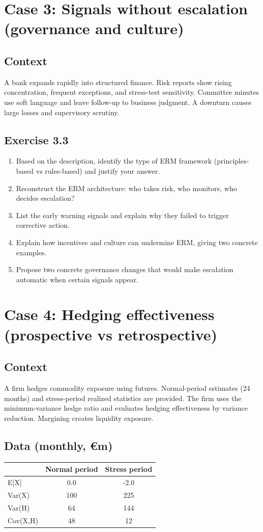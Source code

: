 \documentclass[11pt]{article}
\begin{document}
\section{Case 3: Signals without escalation (governance and culture)}
\subsection*{Context}
A bank expands rapidly into structured finance. Risk reports show rising concentration, frequent exceptions, and stress-test sensitivity. Committee minutes use soft language and leave follow-up to business judgment. A downturn causes large losses and supervisory scrutiny.

\subsection*{Exercise 3.3}
\begin{enumerate}
  \item Based on the description, identify the type of ERM framework (principles-based vs rules-based) and justify your answer.
  \item Reconstruct the ERM architecture: who takes risk, who monitors, who decides escalation?
  \item List the early warning signals and explain why they failed to trigger corrective action.
  \item Explain how incentives and culture can undermine ERM, giving two concrete examples.
  \item Propose two concrete governance changes that would make escalation automatic when certain signals appear.
\end{enumerate}

\newpage
\section{Case 4: Hedging effectiveness (prospective vs retrospective)}
\subsection*{Context}
A firm hedges commodity exposure using futures. Normal-period estimates (24 months) and stress-period realized statistics are provided. The firm uses the minimum-variance hedge ratio and evaluates hedging effectiveness by variance reduction. Margining creates liquidity exposure.

\subsection*{Data (monthly, \euro m)}
\begin{center}
\begin{tabular}{lcc}
\toprule
 & Normal period & Stress period \\
\midrule
E[X] & 0.0 & -2.0 \\
Var(X) & 100 & 225 \\
Var(H) & 64 & 144 \\
Cov(X,H) & 48 & 12 \\
\bottomrule
\end{tabular}
\end{center}
\end{document}
